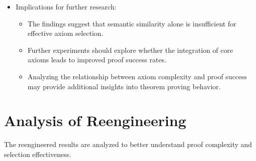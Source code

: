\documentclass[english,version-2020-11]{uzl-thesis}
\begin{document}
\begin{itemize}
    \item Implications for further research:
    \begin{itemize}
        \item The findings suggest that semantic similarity alone is insufficient for effective axiom selection.
        \item Further experiments should explore whether the integration of core axioms leads to improved proof success rates.
        \item Analyzing the relationship between axiom complexity and proof success may provide additional insights into theorem proving behavior.
    \end{itemize}
\end{itemize}

\clearpage

\section{Analysis of Reengineering}

The reengineered results are analyzed to better understand proof complexity and selection effectiveness.
\end{document}
